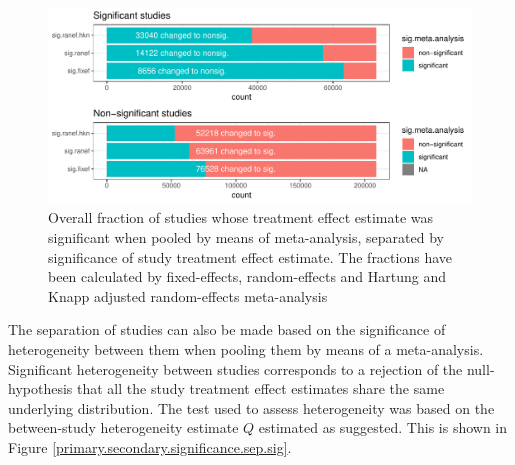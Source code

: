\documentclass[11pt,a4paper,twoside]{book}\usepackage[]{graphicx}\usepackage[]{color}
\newenvironment{knitrout}{}{} %
\begin{document}
\begin{figure}
\begin{knitrout}
\color{fgcolor}

{\centering \includegraphics[width=\textwidth-3cm]{figure/ch02_figunnamed-chunk-20-1} 

}



\end{knitrout}
\caption{Overall fraction of studies whose treatment effect estimate was significant when pooled by means of meta-analysis, separated by significance of study treatment effect estimate. The fractions have been calculated
by fixed-effects, random-effects and Hartung and Knapp adjusted random-effects meta-analysis}
\label{primary.secondary.significance}
\end{figure}

The separation of studies can also be made based on the significance of heterogeneity between them when pooling them by means of a meta-analysis. Significant heterogeneity between studies corresponds to a rejection of the null-hypothesis that all the study treatment effect estimates share the same underlying distribution. The test used to assess heterogeneity was based on the between-study heterogeneity estimate $Q$ estimated as \citet{tau.estimator} suggested. This is shown in Figure \ref{primary.secondary.significance.sep.sig}.
\end{document}
